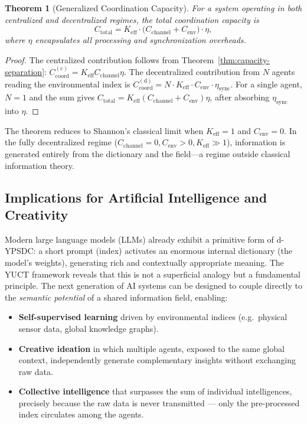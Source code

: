 \documentclass[12pt,a4paper]{article}
\newtheorem{theorem}{Theorem}[section]
\theoremstyle{remark}
\begin{document}
	\begin{theorem}[Generalized Coordination Capacity]
		For a system operating in both centralized and decentralized regimes, the total coordination capacity is
		\begin{equation}
			\boxed{C_{\mathrm{total}} = K_{\mathrm{eff}} \cdot \bigl( C_{\mathrm{channel}} + C_{\mathrm{env}} \bigr) \cdot \eta},
			\label{eq:generalized-capacity}
		\end{equation}
		where \(\eta\) encapsulates all processing and synchronization overheads.
	\end{theorem}
	
	\begin{proof}
		The centralized contribution follows from Theorem~\ref{thm:capacity-separation}: \(C_{\mathrm{coord}}^{\mathrm{(c)}} = K_{\mathrm{eff}} C_{\mathrm{channel}} \eta\). The decentralized contribution from \(N\) agents reading the environmental index is \(C_{\mathrm{coord}}^{\mathrm{(d)}} = N \cdot K_{\mathrm{eff}} \cdot C_{\mathrm{env}} \cdot \eta_{\mathrm{sync}}\). For a single agent, \(N=1\) and the sum gives \(C_{\mathrm{total}} = K_{\mathrm{eff}}(C_{\mathrm{channel}} + C_{\mathrm{env}})\eta\), after absorbing \(\eta_{\mathrm{sync}}\) into \(\eta\).
	\end{proof}
	
	The theorem reduces to Shannon's classical limit when \(K_{\mathrm{eff}} = 1\) and \(C_{\mathrm{env}} = 0\). In the fully decentralized regime (\(C_{\mathrm{channel}} = 0, C_{\mathrm{env}} > 0, K_{\mathrm{eff}} \gg 1\)), information is generated entirely from the dictionary and the field---a regime outside classical information theory.
	
	\subsection{Implications for Artificial Intelligence and Creativity}
	\label{subsec:AI-dypsdc}
	
	Modern large language models (LLMs) already exhibit a primitive form of
	d-YPSDC: a short prompt (index) activates an enormous internal dictionary
	(the model's weights), generating rich and contextually appropriate meaning.
	The YUCT framework reveals that this is not a superficial analogy but a
	fundamental principle. The next generation of AI systems can be designed
	to couple directly to the \emph{semantic potential} of a shared information
	field, enabling:
	\begin{itemize}
		\item \textbf{Self-supervised learning} driven by environmental indices
		(e.g.\ physical sensor data, global knowledge graphs).
		\item \textbf{Creative ideation} in which multiple agents, exposed to the
		same global context, independently generate complementary insights without
		exchanging raw data.
		\item \textbf{Collective intelligence} that surpasses the sum of individual
		intelligences, precisely because the raw data is never transmitted --- only
		the pre-processed index circulates among the agents.
	\end{itemize}
	
\end{document}

